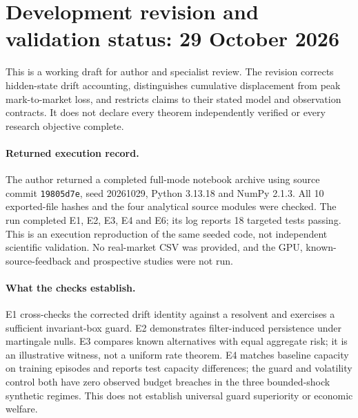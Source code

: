 \section*{Development revision and validation status: 29 October 2026}
This is a working draft for author and specialist review. The revision corrects
hidden-state drift accounting, distinguishes cumulative displacement from peak
mark-to-market loss, and restricts claims to their stated model and observation
contracts. It does not declare every theorem independently verified or every
research objective complete.

\paragraph{Returned execution record.} The author returned a completed full-mode
notebook archive using source commit \texttt{19805d7e}, seed 20261029,
Python 3.13.18 and NumPy 2.1.3. All 10 exported-file hashes and the four analytical
source modules were checked. The run completed E1, E2, E3, E4 and E6; its log
reports 18 targeted tests passing. This is an execution reproduction of the same
seeded code, not independent scientific validation. No real-market CSV was
provided, and the GPU, known-source-feedback and prospective studies were not run.

\paragraph{What the checks establish.} E1 cross-checks the corrected drift identity
against a resolvent and exercises a sufficient invariant-box guard. E2 demonstrates
filter-induced persistence under martingale nulls. E3 compares known alternatives
with equal aggregate risk; it is an illustrative witness, not a uniform rate
theorem. E4 matches baseline capacity on training episodes and reports test
capacity differences; the guard and volatility control both have zero observed
budget breaches in the three bounded-shock synthetic regimes. This does not
establish universal guard superiority or economic welfare.

